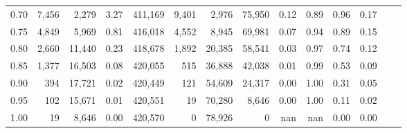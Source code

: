 \begin{tabular}{rrrrrrrrrrrrrr}
0.70 &   7,456 &   2,279 &      3.27 &  411,169 &    9,401 &   2,976 &  75,950 &  0.12 &  0.89 &  0.96 &      0.17 \\
0.75 &   4,849 &   5,969 &      0.81 &  416,018 &    4,552 &   8,945 &  69,981 &  0.07 &  0.94 &  0.89 &      0.15 \\
0.80 &   2,660 &  11,440 &      0.23 &  418,678 &    1,892 &  20,385 &  58,541 &  0.03 &  0.97 &  0.74 &      0.12 \\
0.85 &   1,377 &  16,503 &      0.08 &  420,055 &      515 &  36,888 &  42,038 &  0.01 &  0.99 &  0.53 &      0.09 \\
0.90 &     394 &  17,721 &      0.02 &  420,449 &      121 &  54,609 &  24,317 &  0.00 &  1.00 &  0.31 &      0.05 \\
0.95 &     102 &  15,671 &      0.01 &  420,551 &       19 &  70,280 &   8,646 &  0.00 &  1.00 &  0.11 &      0.02 \\
1.00 &      19 &   8,646 &      0.00 &  420,570 &        0 &  78,926 &       0 &   nan &   nan &  0.00 &      0.00 \\
\bottomrule
\end{tabular}
